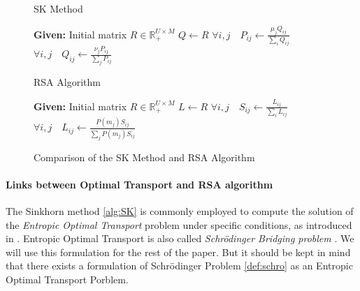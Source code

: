 \documentclass{article}
\begin{document}
\begin{figure}[H]
    \centering
    \begin{minipage}[t]{0.45\textwidth}
        \begin{algorithm}[H]
        \caption{SK Method}  \label{alg:SK}
        \begin{algorithmic}[1]
            \State \textbf{Given:} Initial matrix $R \in \mathbb{R}^{U \times M}_{+}$
            \State $Q \gets R$
            \Repeat
                \State \(\forall i,j\quad P_{ij} \gets \frac{\mu_j Q_{ij}}{\sum_iQ_{ij}}\)
                \State \(\forall i,j\quad Q_{ij} \gets \frac{\nu_jP_{ij}}{\sum_jP_{ij}}\)
        \end{algorithmic}
        \end{algorithm}
    \end{minipage}
    \hfill
    \begin{minipage}[t]{0.45\textwidth}
        \begin{algorithm}[H]
        \caption{RSA Algorithm}  \label{alg:RSA}
        \begin{algorithmic}[1]
            \State \textbf{Given:} Initial matrix $R \in \mathbb{R}^{U \times M}_{+}$
            \State $L \gets R$
            \Repeat
                \State \(\forall i,j\quad S_{ij} \gets \frac{L_{ij}}{\sum_i L_{ij}}\)
                \State \(\forall i,j\quad L_{ij} \gets \frac{P(m_j) S_{ij}}{\sum_j P(m_j) S_{ij}}\)
        \end{algorithmic}
        \end{algorithm}
    \end{minipage}
    \caption{Comparison of the SK Method and RSA Algorithm}
    \label{fig:alg-comparison}
\end{figure}


\paragraph{Links between Optimal Transport and RSA algorithm} The Sinkhorn method \ref{alg:SK} is commonly employed to compute the solution of the \textit{Entropic Optimal Transport} problem under specific conditions, as introduced in \cite{cuturi2013sinkhorndistanceslightspeedcomputation}. Entropic Optimal Transport is also called \textit{Schrödinger Bridging problem} \cite{gushchin2023buildingbridgeschrodingercontinuous} \cite{léonard2013surveyschrodingerproblemconnections}. We will use this formulation for the rest of the paper. But it should be kept in mind that there exists a formulation of Schrödinger Problem \ref{def:schro} as an Entropic Optimal Transport Porblem. 
 
\end{document}
